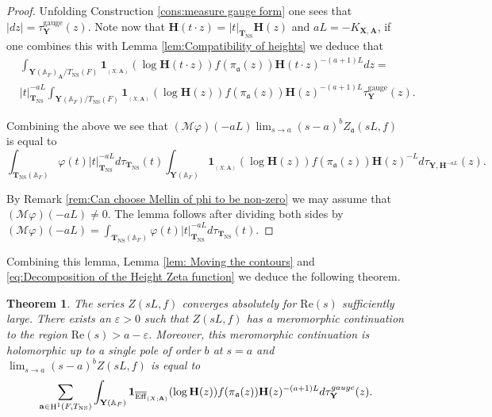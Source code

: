 \documentclass[a4paper,11pt,reqno]{amsart}
\newcommand{\A}{\mathbb{A}}
\DeclareMathOperator{\NS}{NS}
\DeclareMathOperator{\Eff}{\overline{Eff}}
\DeclareMathOperator{\HH}{H}
\renewcommand{\Re}{\mathrm{Re}}
\newtheorem{theorem}{Theorem}[section]
\theoremstyle{definition}
\begin{document}
\begin{proof}
	Unfolding Construction \ref{cons:measure gauge form} one sees that $|dz| = \tau_{\mathbf{Y}}^{\text{gauge}}(z)$. Note now that $\mathbf{H}(t \cdot z) = |t|_{\mathbf{T}_{\NS}} \mathbf{H}(z)$ and $aL = -K_{\mathbf{X, \mathbf{A}}}$, if one combines this with Lemma \ref{lem:Compatibility of heights} we deduce that 
	\[
	\begin{split}
		&\int_{\mathbf{Y}(\A_F)_{\mathbf{A}}/T_{\NS}(F)} \mathbf{1}_{\Eff_{(X ; \mathbf{A})}}(\log \mathbf{H}(t \cdot z)) f(\pi_{\mathfrak{a}}(z)) \mathbf{H}(t \cdot z)^{- (a + 1)L} d z = \\
		&|t|_{\mathbf{T}_{\NS}}^{- a L}\int_{\mathbf{Y}(\A_F)/T_{\NS}(F)} \mathbf{1}_{\Eff_{(X ; \mathbf{A})}}(\log \mathbf{H}(z)) f(\pi_{\mathfrak{a}}(z)) \mathbf{H}(z)^{-(a + 1)L}\tau_{\mathbf{Y}}^{\text{gauge}}(z).
	\end{split}
	\]
	
	Combining the above we see that $(\mathcal{M} \varphi)(-aL) \lim_{s \to a} (s - a)^b Z_{\mathfrak{a}}(s L, f)$ is equal to
	\[
	\int_{\mathbf{T}_{\NS}(\A_F)} \varphi(t) |t|_{\mathbf{T}_{\NS}}^{- a L} d\tau_{\mathbf{T}_{\NS}}(t) \int_{\mathbf{Y}(\A_F)} \mathbf{1}_{\Eff_{(X ; \mathbf{A})}}(\log \mathbf{H}(z)) f(\pi_{\mathfrak{a}}(z)) \mathbf{H}(z)^{- L} d \tau_{\mathbf{Y}, \mathbf{H}^{-aL}}(z).
	\]
	
	By Remark \ref{rem:Can choose Mellin of phi to be non-zero} we may assume that $(\mathcal{M} \varphi)(-aL) \neq 0$. The lemma follows after dividing both sides by $(\mathcal{M} \varphi)(-aL) =  \int_{\mathbf{T}_{\NS}(\A_F)} \varphi(t) |t|_{\mathbf{T}_{\NS}}^{- a L} d\tau_{\mathbf{T}_{\NS}}(t)$.
\end{proof}
Combining this lemma, Lemma \ref{lem: Moving the contours} and \eqref{eq:Decomposition of the Height Zeta function} we deduce the following theorem.
\begin{theorem}\label{thm:Meromorphic continuation of height zeta function anticanonical}
	The series $Z(s L, f)$ converges absolutely for $\Re(s)$ sufficiently large. There exists an $\varepsilon > 0$ such that $Z(s L, f)$ has a meromorphic continuation to the region $\Re(s) > a - \varepsilon$. Moreover, this meromorphic continuation is holomorphic up to a single pole of order $b$ at $s = a$ and $\lim_{s \to a} (s - a)^bZ(s L, f)$ is equal to
	\[
	 \sum_{\mathbf{a} \in \HH^1(F, T_{\NS})} \int_{\mathbf{Y}(\A_F)} \mathbf{1}_{\Eff_{(X ; \mathbf{A})}}(\log \mathbf{H}(z)) f(\pi_{\mathfrak{a}}(z)) \mathbf{H}(z)^{- (a + 1)L} d \tau_{\mathbf{Y}}^{\emph{gauge}}(z).
	\]
\end{theorem}
\end{document}
